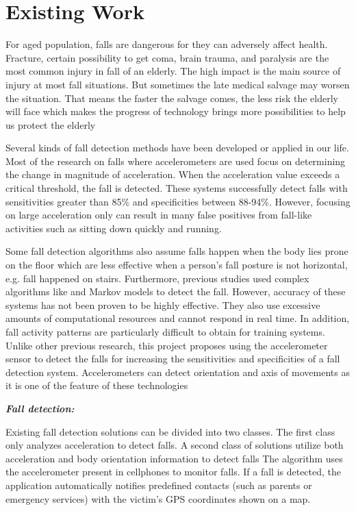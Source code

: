 \section{Existing Work}

For aged population, falls are dangerous for they can adversely affect health. \cite{LiQ091} %
Fracture, certain possibility to get coma, brain trauma, and paralysis are the most common injury in fall of an elderly. The high impact is the main source of injury at most fall situations. But sometimes the late medical salvage may worsen the situation. That means the faster the salvage comes, the less risk the elderly will face which makes the progress of technology brings more possibilities to help us protect the elderly \cite{WuF14} %

Several kinds of fall detection methods have been developed or applied in our life. Most of the research on falls where accelerometers are used focus on determining the change in magnitude of acceleration. When the acceleration value exceeds a critical threshold, the fall is detected. These systems successfully detect falls with sensitivities greater than 85\% and specificities between 88-94\%. However, focusing on large acceleration only can result in many false positives from fall-like activities such as sitting down quickly and running. \cite{Huy13} %

Some fall detection algorithms also assume falls happen when the body lies prone on the floor which are less effective when a person’s fall posture is not horizontal, e.g. fall happened on stairs. Furthermore, previous studies used complex algorithms like  and Markov models to detect the fall. However, accuracy of these systems has not been proven to be highly effective. They also use excessive amounts of computational resources and cannot respond in real time. In addition, fall activity patterns are particularly difficult to obtain for training systems. Unlike other previous research, this project proposes using the accelerometer sensor to detect the falls for increasing the sensitivities and specificities of a fall detection system. Accelerometers can detect orientation and axis of movements as it is one of the feature of these technologies \cite{Huy13} %

\noindent \textbf{\textit{Fall detection:}}

Existing fall detection solutions can be divided into two classes. The first class only analyzes acceleration to detect falls. A second class of solutions utilize both acceleration and body orientation information to detect falls \cite{LiQ091} %
The algorithm uses the accelerometer present in cellphones to monitor falls. If a fall is detected, the application automatically notifies predefined contacts (such as parents or emergency services) with the victim’s GPS coordinates shown on a map. \cite{Kaz14} %

